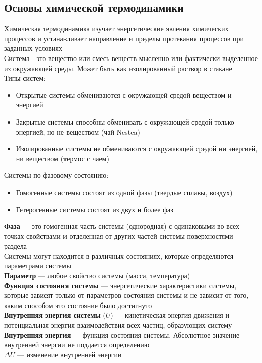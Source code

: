 \documentclass[a4paper, 12pt, oneside]{article}
\begin{document}
\subsection{Основы химической термодинамики}
Химическая термодинамика изучает энергетические явления химических процессов и устанавливает направление и пределы протекания процессов при заданных условиях\\
Система - это вещество или смесь веществ мысленно или фактически выделенное из окружающей среды. Может быть как изолированный раствор в стакане\\
Типы систем:
\begin{itemize}
	\item Открытые системы обмениваются с окружающей средой веществом и энергией
	\item Закрытые системы способны обменивать с окружающей средой только энергией, но не веществом (чай Nestea)
	\item Изолированные системы не обмениваются с окружающей средой ни энергией, ни веществом (термос с чаем)
\end{itemize}
Системы по фазовому состоянию:
\begin{itemize}
	\item Гомогенные системы состоят из одной фазы (твердые сплавы, воздух)
	\item Гетерогенные системы состоят из двух и более фаз
\end{itemize}
{\bfseries Фаза} --- это гомогенная часть системы (однородная) с одинаковыми во всех точках свойствами и отделенная от других частей системы поверхностями раздела\\
Системы могут находится в различных состояниях, которые определяются параметрами системы\\
{\bfseries Параметр} --- любое свойство системы (масса, температура)\\
{\bfseries Функция состояния системы} --- энергетические характеристики системы, которые зависят только от параметров состояния системы и не зависит от того, каким способом это состояние было достигнуто\\
{\bfseries Внутренняя энергия системы} ($U$) --- кинетическая энергия движения и потенциальная энергия взаимодействия всех частиц, образующих систему\\
{\bfseries Внутренняя энергия} --- функция состояния системы. Абсолютное значение внутренней энергии не поддается определению\\
$\varDelta U$ --- изменение внутренней энергии\\
\end{document}
